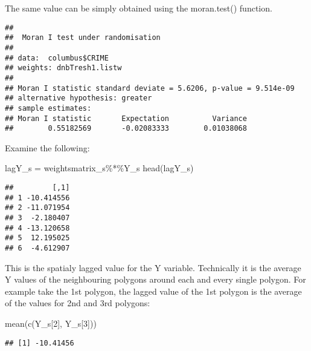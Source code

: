 \documentclass[
]{book}
\newenvironment{Shaded}{\begin{snugshade}}{\end{snugshade}}
\newcommand{\DecValTok}[1]{\textcolor[rgb]{0.00,0.00,0.81}{#1}}
\newcommand{\FunctionTok}[1]{\textcolor[rgb]{0.00,0.00,0.00}{#1}}
\newcommand{\NormalTok}[1]{#1}
\newcommand{\OtherTok}[1]{\textcolor[rgb]{0.56,0.35,0.01}{#1}}
\newcommand{\SpecialCharTok}[1]{\textcolor[rgb]{0.00,0.00,0.00}{#1}}
\begin{document}
The same value can be simply obtained using the moran.test() function.

\begin{Shaded}
\end{Shaded}

\begin{verbatim}
## 
##  Moran I test under randomisation
## 
## data:  columbus$CRIME  
## weights: dnbTresh1.listw    
## 
## Moran I statistic standard deviate = 5.6206, p-value = 9.514e-09
## alternative hypothesis: greater
## sample estimates:
## Moran I statistic       Expectation          Variance 
##        0.55182569       -0.02083333        0.01038068
\end{verbatim}

Examine the following:

\begin{Shaded}
\begin{Highlighting}[]
\NormalTok{lagY\_s }\OtherTok{=}\NormalTok{ weightsmatrix\_s}\SpecialCharTok{\%*\%}\NormalTok{Y\_s}
\FunctionTok{head}\NormalTok{(lagY\_s)}
\end{Highlighting}
\end{Shaded}

\begin{verbatim}
##         [,1]
## 1 -10.414556
## 2 -11.071954
## 3  -2.180407
## 4 -13.120658
## 5  12.195025
## 6  -4.612907
\end{verbatim}

This is the spatialy lagged value for the Y variable. Technically it is the average Y values of the neighbouring polygons around each and every single polygon. For example take the 1st polygon, the lagged value of the 1st polygon is the average of the values for 2nd and 3rd polygons:

\begin{Shaded}
\begin{Highlighting}[]
\FunctionTok{mean}\NormalTok{(}\FunctionTok{c}\NormalTok{(Y\_s[}\DecValTok{2}\NormalTok{], Y\_s[}\DecValTok{3}\NormalTok{]))}
\end{Highlighting}
\end{Shaded}

\begin{verbatim}
## [1] -10.41456
\end{verbatim}
\end{document}
